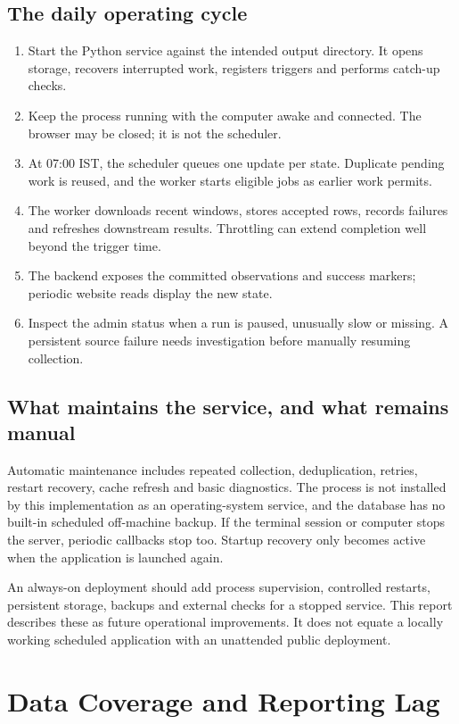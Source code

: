 \documentclass[12pt,a4paper,oneside]{report}
\numberwithin{equation}{chapter}
\numberwithin{figure}{chapter}
\numberwithin{table}{chapter}
\theoremstyle{definition}
\begin{document}
\section{The daily operating cycle}
\begin{enumerate}
  \item Start the Python service against the intended output directory. It opens storage, recovers interrupted work, registers triggers and performs catch-up checks.
  \item Keep the process running with the computer awake and connected. The browser may be closed; it is not the scheduler.
  \item At 07:00 IST, the scheduler queues one update per state. Duplicate pending work is reused, and the worker starts eligible jobs as earlier work permits.
  \item The worker downloads recent windows, stores accepted rows, records failures and refreshes downstream results. Throttling can extend completion well beyond the trigger time.
  \item The backend exposes the committed observations and success markers; periodic website reads display the new state.
  \item Inspect the admin status when a run is paused, unusually slow or missing. A persistent source failure needs investigation before manually resuming collection.
\end{enumerate}

\section{What maintains the service, and what remains manual}
Automatic maintenance includes repeated collection, deduplication, retries, restart recovery, cache refresh and basic diagnostics. The process is not installed by this implementation as an operating-system service, and the database has no built-in scheduled off-machine backup. If the terminal session or computer stops the server, periodic callbacks stop too. Startup recovery only becomes active when the application is launched again.

An always-on deployment should add process supervision, controlled restarts, persistent storage, backups and external checks for a stopped service. This report describes these as future operational improvements. It does not equate a locally working scheduled application with an unattended public deployment.

\chapter{Data Coverage and Reporting Lag}
\end{document}
